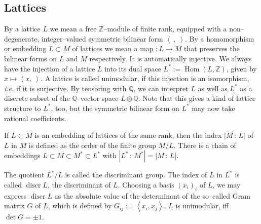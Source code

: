\documentclass{amsart}
\DeclareMathOperator{\Hom}{Hom}
\DeclareMathOperator{\discr}{discr}
\newcommand{\DP}{\,{:}\,}
\newcommand{\ie}{{\it i.e. }}
\newcommand{\coloneqq}{:=}
\newcommand{\Q}{\mathbb{Q}}
\newcommand{\Z}{\mathbb{Z}}
\theoremstyle{plain}
\theoremstyle{definition}
\theoremstyle{remark}
\begin{document}
\subsection{Lattices}\label{latticeSubsection} By a lattice $L$ we mean a free $\Z$--module of finite rank, equipped with a non--degenerate, integer--valued symmetric bilinear form $\left<\ ,\;\right>$. By a homomorphism or embedding $L\subset M$ of lattices we mean a map $:L\rightarrow M$ that preserves the bilinear forms on $L$ and $M$ respectively. It is automatically injective. We always have the injection of a lattice $L$ into its dual space $L^*\coloneqq \Hom(L,\Z)$, given by $x \mapsto \left<x,\ \right>$. A lattice is called unimodular, if this injection is an isomorphism, \ie if it is surjective. By tensoring with $\Q$, we can interpret $L$ as well as $L^*$ as a discrete subset of the $\Q$--vector space $L\otimes \Q$. Note that this gives a kind of lattice structure to $L^*$, too, but the symmetric bilinear form on $L^*$ may now take rational coefficients.

If $L\subset M$ is an embedding of lattices of the same rank, then the index $|M\DP L|$ of $L$ in $M$ is defined as the order of the finite group $M/L$.
There is a chain of embeddings $L\subset M \subset M^* \subset L^*$ with $|L^*\DP M^*| =|M\DP L| $.

The quotient $L^*/L$ is called the discriminant group. The index of $L$ in $L^*$ is called $\discr L$, the discriminant of $L$.
Choosing a basis $(x_i)_i$ of $L$, we may express $\discr L$ as the absolute value of the determinant of the so--called Gram matrix $G$ of $L$, which is defined by $G_{ij}\coloneqq \left<x_i,x_j\right>$. $L$ is unimodular, iff $\det G =\pm 1$.
\end{document}
